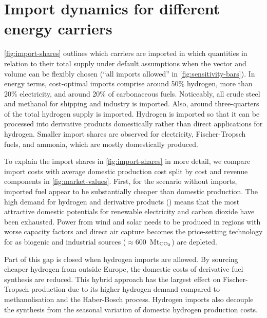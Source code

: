\section*{Import dynamics for different energy carriers}


\cref{fig:import-shares} outlines which carriers are imported in which
quantities in relation to their total supply under default assumptions when the
vector and volume can be flexibly chosen (``all imports allowed'' in
\cref{fig:sensitivity-bars}). In energy terms, cost-optimal imports comprise
around 50\% hydrogen, more than 20\% electricity, and around 20\% of
carbonaceous fuels. Noticeably, all crude steel and methanol for shipping and
industry is imported. Also, around three-quarters of the total hydrogen supply
is imported. Hydrogen is imported so that it can be processed into derivative
products domestically rather than direct applications for hydrogen. Smaller
import shares are observed for electricity, Fischer-Tropsch fuels, and ammonia,
which are mostly domestically produced.


To explain the import shares in \cref{fig:import-shares} in more detail, we
compare import costs with average domestic production cost split by cost and
revenue components in \cref{fig:market-values}. First, for the scenario without
imports, imported fuel appear to be substantially cheaper than domestic
production. The high demand for hydrogen and derivative products
() means that the most attractive
domestic potentials for renewable electricity and carbon dioxide have been
exhausted. Power from wind and solar needs to be produced in regions with worse
capacity factors and direct air capture becomes the price-setting technology for
 as biogenic and industrial sources ($\approx$600~Mt$_\text{\ce{CO2}}$)
are depleted.


Part of this gap is closed when hydrogen imports are allowed. By sourcing
cheaper hydrogen from outside Europe, the domestic costs of derivative fuel
synthesis are reduced. This hybrid approach has the largest effect on
Fischer-Tropsch production due to its higher hydrogen demand compared to
methanolisation and the Haber-Bosch process. Hydrogen imports also decouple the
synthesis from the seasonal variation of domestic hydrogen production costs.

